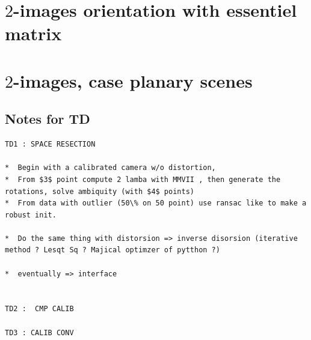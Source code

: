 \section{$2$-images orientation with essentiel matrix}


\section{$2$-images, case planary scenes}



\subsection{Notes for TD}


\begin{verbatim}
TD1 : SPACE RESECTION

*  Begin with a calibrated camera w/o distortion,
*  From $3$ point compute 2 lamba with MMVII , then generate the rotations, solve ambiquity (with $4$ points)
*  From data with outlier (50\% on 50 point) use ransac like to make a robust init.

*  Do the same thing with distorsion => inverse disorsion (iterative method ? Lesqt Sq ? Majical optimzer of pytthon ?)

*  eventually => interface


TD2 :  CMP CALIB

TD3 : CALIB CONV
\end{verbatim}





